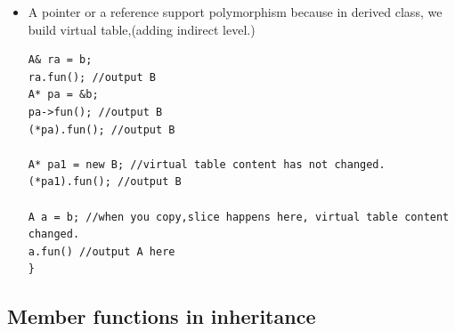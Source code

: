 \documentclass[a4paper,11pt,twoside]{book}
\begin{document}
\begin{itemize}
\item A pointer or a reference support polymorphism because in derived class, we build virtual table,(adding indirect level.)
\begin{lstlisting}
A& ra = b;
ra.fun(); //output B
A* pa = &b;
pa->fun(); //output B
(*pa).fun(); //output B
		
A* pa1 = new B; //virtual table content has not changed.
(*pa1).fun(); //output B

A a = b; //when you copy,slice happens here, virtual table content changed. 
a.fun() //output A here
}
\end{lstlisting}

\end{itemize}

\subsection{Member functions in inheritance}
\end{document}
